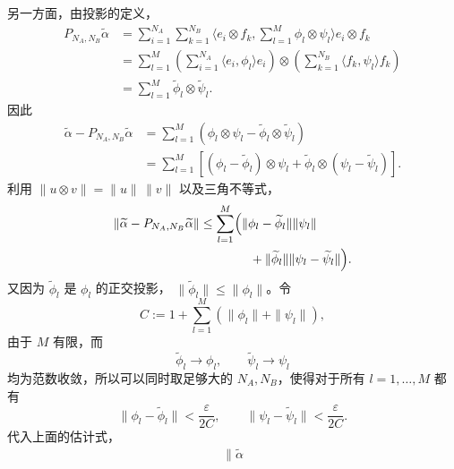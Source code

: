 \documentclass[UTF8,a4paper,11pt,openany]{ctexbook}
\begin{document}
\begin{proofblock}
另一方面，由投影的定义，
\begin{align}
    P_{N_A,N_B}\widetilde{\alpha}
    &=
    \sum_{i=1}^{N_A}
    \sum_{k=1}^{N_B}
    \langle e_i\otimes f_k,
    \sum_{l=1}^{M} \phi_l\otimes\psi_l\rangle
    e_i\otimes f_k
    \nonumber\\
    &=
    \sum_{l=1}^{M}
    \left(
        \sum_{i=1}^{N_A}
        \langle e_i,\phi_l\rangle e_i
    \right)
    \otimes
    \left(
        \sum_{k=1}^{N_B}
        \langle f_k,\psi_l\rangle f_k
    \right)
    \nonumber\\
    &=
    \sum_{l=1}^{M}
    \widetilde{\phi}_l
    \otimes
    \widetilde{\psi}_l.
\end{align}
因此
\begin{align}
    \widetilde{\alpha}
    -
    P_{N_A,N_B}\widetilde{\alpha}
    &=
    \sum_{l=1}^{M}
    \left(
        \phi_l\otimes\psi_l
        -
        \widetilde{\phi}_l\otimes\widetilde{\psi}_l
    \right)
    \nonumber\\
    &=
    \sum_{l=1}^{M}
    \left[
        (\phi_l-\widetilde{\phi}_l)\otimes\psi_l
        +
        \widetilde{\phi}_l
        \otimes
        (\psi_l-\widetilde{\psi}_l)
    \right].
\end{align}
利用
$\|u\otimes v\|=\|u\|\,\|v\|$ 以及三角不等式，
\begin{align}
    \|
        \widetilde{\alpha}
        -
        P_{N_A,N_B}\widetilde{\alpha}
    \|
    &\leq
    \sum_{l=1}^{M}
    \Bigl(
        \|\phi_l-\widetilde{\phi}_l\|
        \|\psi_l\|
        \nonumber\\
    &\qquad\qquad+
        \|\widetilde{\phi}_l\|
        \|\psi_l-\widetilde{\psi}_l\|
    \Bigr).
\end{align}
又因为 $\widetilde{\phi}_l$ 是 $\phi_l$ 的正交投影，
$\|\widetilde{\phi}_l\|\leq\|\phi_l\|$。令
\begin{equation}
    C
    :=
    1+
    \sum_{l=1}^{M}
    \left(
        \|\phi_l\|+\|\psi_l\|
    \right),
\end{equation}
由于 $M$ 有限，而
\[
\widetilde{\phi}_l\to\phi_l,
\qquad
\widetilde{\psi}_l\to\psi_l
\]
均为范数收敛，所以可以同时取足够大的 $N_A,N_B$，使得对于所有
$l=1,\ldots,M$ 都有
\begin{equation}
    \|\phi_l-\widetilde{\phi}_l\|
    <
    \frac{\varepsilon}{2C},
    \qquad
    \|\psi_l-\widetilde{\psi}_l\|
    <
    \frac{\varepsilon}{2C}.
\end{equation}
代入上面的估计式，
\begin{align}
    \|
        \widetilde{\alpha}

\end{align}
\end{proofblock}
\end{document}
